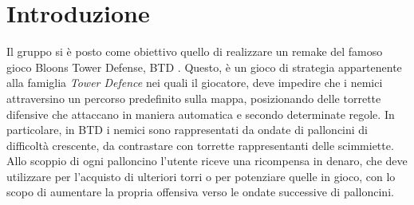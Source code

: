 \section*{Introduzione}
Il gruppo si è posto come obiettivo quello di realizzare un remake del famoso gioco Bloons Tower Defense, BTD \cite{BaloonsTD5}.
Questo, è un gioco di strategia appartenente alla famiglia \textit{Tower Defence} nei quali il giocatore,
deve impedire che i nemici attraversino un percorso predefinito sulla mappa,
posizionando delle torrette difensive che attaccano in maniera automatica e secondo determinate regole.
In particolare, in BTD i nemici sono rappresentati da ondate di palloncini di difficoltà crescente,
da contrastare con torrette rappresentanti delle scimmiette.
Allo scoppio di ogni palloncino l'utente riceve una ricompensa in denaro,
che deve utilizzare per l'acquisto di ulteriori torri o per potenziare quelle in gioco,
con lo scopo di aumentare la propria offensiva verso le ondate successive di palloncini.